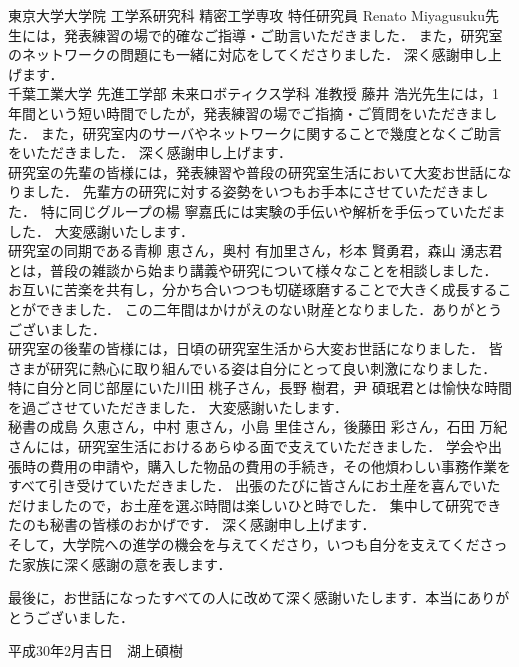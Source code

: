 東京大学大学院 工学系研究科 精密工学専攻 特任研究員 Renato Miyagusuku先生には，発表練習の場で的確なご指導・ご助言いただきました．
また，研究室のネットワークの問題にも一緒に対応をしてくださりました．
深く感謝申し上げます．\\

千葉工業大学 先進工学部 未来ロボティクス学科 准教授 藤井 浩光先生には，1年間という短い時間でしたが，発表練習の場でご指摘・ご質問をいただきました．
また，研究室内のサーバやネットワークに関することで幾度となくご助言をいただきました．
深く感謝申し上げます．\\

研究室の先輩の皆様には，発表練習や普段の研究室生活において大変お世話になりました．
先輩方の研究に対する姿勢をいつもお手本にさせていただきました．
特に同じグループの楊 寧嘉氏には実験の手伝いや解析を手伝っていただました．
大変感謝いたします．\\

研究室の同期である青柳 恵さん，奥村 有加里さん，杉本 賢勇君，森山 湧志君とは，普段の雑談から始まり講義や研究について様々なことを相談しました．
お互いに苦楽を共有し，分かち合いつつも切磋琢磨することで大きく成長することができました．
この二年間はかけがえのない財産となりました．ありがとうございました．\\

研究室の後輩の皆様には，日頃の研究室生活から大変お世話になりました．
皆さまが研究に熱心に取り組んでいる姿は自分にとって良い刺激になりました．
特に自分と同じ部屋にいた川田 桃子さん，長野 樹君，尹 碩珉君とは愉快な時間を過ごさせていただきました．
大変感謝いたします．\\

秘書の成島 久恵さん，中村 恵さん，小島 里佳さん，後藤田 彩さん，石田 万紀さんには，研究室生活におけるあらゆる面で支えていただきました．
学会や出張時の費用の申請や，購入した物品の費用の手続き，その他煩わしい事務作業をすべて引き受けていただきました．
出張のたびに皆さんにお土産を喜んでいただけましたので，お土産を選ぶ時間は楽しいひと時でした．
集中して研究できたのも秘書の皆様のおかげです．
深く感謝申し上げます．\\

そして，大学院への進学の機会を与えてくださり，いつも自分を支えてくださった家族に深く感謝の意を表します．

最後に，お世話になったすべての人に改めて深く感謝いたします．本当にありがとうございました．


\begin{flushright}
平成30年2月吉日　湖上碩樹
\end{flushright}

\newpage

